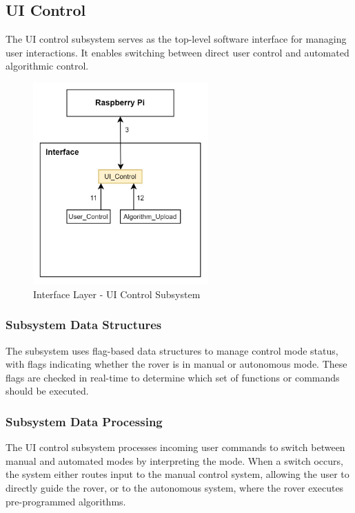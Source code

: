 \newpage

\subsection{UI Control}
The UI control subsystem serves as the top-level software interface for managing user interactions. It enables switching between direct user control and automated algorithmic control.

\begin{figure}[h!]
	\centering
 	\includegraphics[width=0.60\textwidth]{images/interface/1_ui.jpg}
 \caption{Interface Layer - UI Control Subsystem}
\end{figure}

\subsubsection{Subsystem Data Structures}
The subsystem uses flag-based data structures to manage control mode status, with flags indicating whether the rover is in manual or autonomous mode. These flags are checked in real-time to determine which set of functions or commands should be executed.

\subsubsection{Subsystem Data Processing}
The UI control subsystem processes incoming user commands to switch between manual and automated modes by interpreting the mode. When a switch occurs, the system either routes input to the manual control system, allowing the user to directly guide the rover, or to the autonomous system, where the rover executes pre-programmed algorithms.

